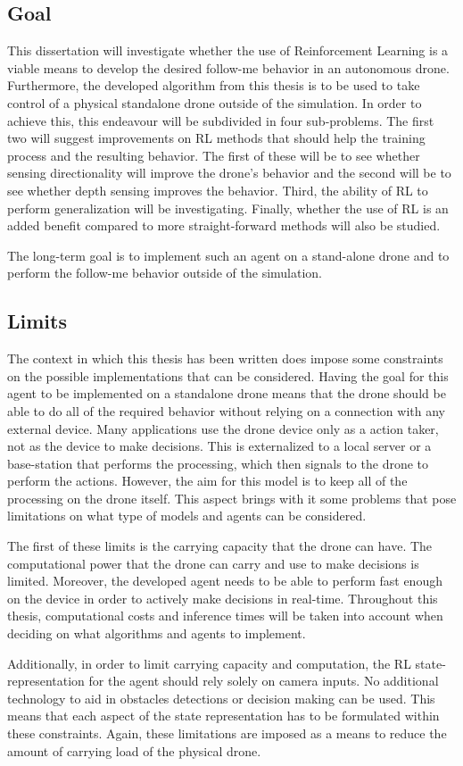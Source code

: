 \subsection{Goal} \label{limitations}
This dissertation will investigate whether the use of Reinforcement Learning is a viable means 
to develop the desired follow-me behavior in an autonomous drone. Furthermore, the 
developed algorithm from this thesis is to be used to take control of a physical standalone 
drone outside of the simulation. In order to achieve this, this endeavour will be subdivided 
in four sub-problems. The first two will suggest improvements on RL methods that should help 
the training process and the resulting behavior. The first of these will be to see whether 
sensing directionality will improve the drone's behavior and the second will be to see 
whether depth sensing improves the behavior. Third, the ability of RL to perform generalization 
will be investigating. Finally, whether the use of RL is an added benefit compared to more 
straight-forward methods will also be studied. 

The long-term goal is to implement such an agent on a stand-alone drone and to perform 
the follow-me behavior outside of the simulation. 

\subsection{Limits} \label{limitations}
The context in which this thesis has been written does impose some constraints on the 
possible implementations that can be considered. Having the goal for this agent to be 
implemented on a standalone drone means that the drone should be able to do all of the 
required behavior without relying on 
a connection with any external device. Many applications use the drone device only as a 
action taker, not as the device to make decisions. This is externalized to 
a local server or a base-station that performs the processing, which then signals to the 
drone to perform the actions. However, the aim for this model is to keep all of the 
processing on the drone itself. This aspect brings with it some 
problems that pose limitations on what type of models and agents can be considered. 

The first of these limits is the carrying capacity that the drone can have. The computational
power that the drone can carry 
and use to make decisions is limited. Moreover, the developed agent needs to be able 
to perform fast enough on the device in order to actively make decisions in real-time. 
Throughout this thesis, computational costs and inference times will 
be taken into account when deciding on what algorithms and agents to implement.

Additionally, in order to limit carrying capacity and computation, the RL state-representation
for the agent should rely solely on camera inputs. No additional technology to aid in obstacles 
detections or decision making can be used. This means that each aspect of the state 
representation has to be formulated within these constraints. Again, these limitations are 
imposed as a means to reduce the amount of carrying load of the physical drone. 



